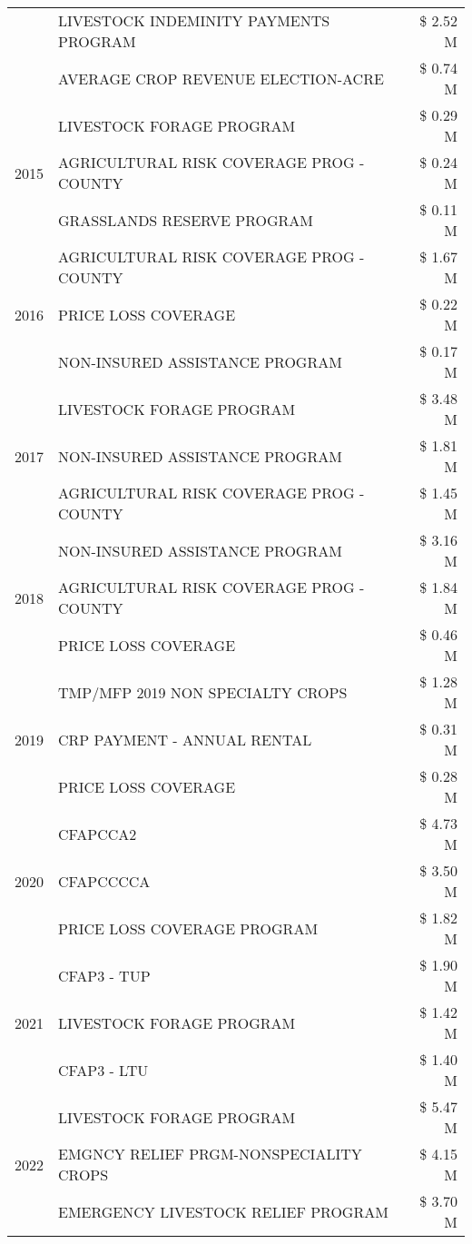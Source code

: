 \begin{tabular}{llr}
 & LIVESTOCK INDEMINITY PAYMENTS PROGRAM & \$ 2.52 M \\
 & AVERAGE CROP REVENUE ELECTION-ACRE & \$ 0.74 M \\
\cline{1-3}
\multirow[t]{3}{*}{2015} & LIVESTOCK FORAGE PROGRAM & \$ 0.29 M \\
 & AGRICULTURAL RISK COVERAGE PROG - COUNTY & \$ 0.24 M \\
 & GRASSLANDS RESERVE PROGRAM & \$ 0.11 M \\
\cline{1-3}
\multirow[t]{3}{*}{2016} & AGRICULTURAL RISK COVERAGE PROG - COUNTY & \$ 1.67 M \\
 & PRICE LOSS COVERAGE & \$ 0.22 M \\
 & NON-INSURED ASSISTANCE PROGRAM & \$ 0.17 M \\
\cline{1-3}
\multirow[t]{3}{*}{2017} & LIVESTOCK FORAGE PROGRAM & \$ 3.48 M \\
 & NON-INSURED ASSISTANCE PROGRAM & \$ 1.81 M \\
 & AGRICULTURAL RISK COVERAGE PROG - COUNTY & \$ 1.45 M \\
\cline{1-3}
\multirow[t]{3}{*}{2018} & NON-INSURED ASSISTANCE PROGRAM & \$ 3.16 M \\
 & AGRICULTURAL RISK COVERAGE PROG - COUNTY & \$ 1.84 M \\
 & PRICE LOSS COVERAGE & \$ 0.46 M \\
\cline{1-3}
\multirow[t]{3}{*}{2019} & TMP/MFP 2019 NON SPECIALTY CROPS & \$ 1.28 M \\
 & CRP PAYMENT - ANNUAL RENTAL & \$ 0.31 M \\
 & PRICE LOSS COVERAGE & \$ 0.28 M \\
\cline{1-3}
\multirow[t]{3}{*}{2020} & CFAPCCA2 & \$ 4.73 M \\
 & CFAPCCCCA & \$ 3.50 M \\
 & PRICE LOSS COVERAGE PROGRAM & \$ 1.82 M \\
\cline{1-3}
\multirow[t]{3}{*}{2021} & CFAP3 - TUP & \$ 1.90 M \\
 & LIVESTOCK FORAGE PROGRAM & \$ 1.42 M \\
 & CFAP3 - LTU & \$ 1.40 M \\
\cline{1-3}
\multirow[t]{3}{*}{2022} & LIVESTOCK FORAGE PROGRAM & \$ 5.47 M \\
 & EMGNCY RELIEF PRGM-NONSPECIALITY CROPS & \$ 4.15 M \\
 & EMERGENCY LIVESTOCK RELIEF PROGRAM & \$ 3.70 M \\
\cline{1-3}
\bottomrule
\end{tabular}
